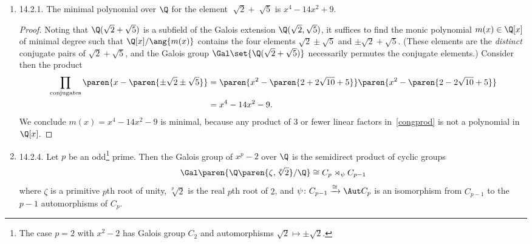 \documentclass[onesided]{ccg-pset}
\author{Colton Grainger}
\date{\today}
\begin{document}
\maketitle

\begin{enumerate}

\item \label{14.2.1} 14.2.1.
The minimal polynomial over $\Q$ for the element $\sqrt[]{ 2 } + \sqrt[]{ 5 }$ is $x^4 - 14x^2 +9$.

\begin{proof}
    Noting that $\Q(\sqrt{ 2 } + \sqrt{ 5 })$ is a subfield of the Galois extension $\Q(\sqrt{ 2 } , \sqrt{ 5 })$, it suffices to find the monic polynomial $m(x) \in \Q[x]$ of minimal degree such that $\Q[x]/\ang{m(x)}$ contains the four elements $\sqrt{ 2 } \pm \sqrt{ 5 }$ and $\pm \sqrt{ 2 } + \sqrt{ 5 }$. (These elements are the \emph{distinct} conjugate pairs of $\sqrt{ 2 } + \sqrt{ 5 }$, and the Galois group $\Gal\set{\Q(\sqrt{ 2 } + \sqrt{ 5 })}$ necessarily permutes the conjugate elements.) Consider then the product
    \begin{align}
        \prod\limits_{\text{conjugates}}\paren{x - \paren{\pm\sqrt{ 2 } \pm \sqrt{ 5 }}} 
        \label{congprod}
            & = \paren{ x^2 -\paren{ 2 + 2\sqrt{ 10 }+5  }  } \paren{ x^2 - \paren{ 2 - 2\sqrt{ 10 } + 5 }  } \\
            & = x^4 - 14x^2 -9.
    \end{align}
    We conclude $m(x) = x^4 - 14x^2 -9$ is minimal, because any product of $3$ or fewer linear factors in~\eqref{congprod} is not a polynomial in $\Q[x]$.
\end{proof}

\item \label{14.2.4} 14.2.4. 
    Let $p$ be an odd\footnote{The case $p=2$ with $x^2 -2$ has Galois group $C_2$ and automorphisms $\sqrt{ 2 } \mapsto \pm \sqrt{ 2 }$.} prime. Then the Galois group of $x^{p}-2$ over $\Q$ is the semidirect product of cyclic groups
    \[
        \Gal\paren{ \Q\paren{ \zeta, \sqrt[p]{ 2 } } / \Q }  \cong C_p \rtimes_\psi C_{p-1}
    \]
    where $\zeta$ is a primitive $p$th root of unity, $\sqrt[p]{ 2 }$ is the real $p$th root of $2$, and $\psi \colon C_{p-1} \xrightarrow{\cong} \Aut C_p$ is an isomorphism from $C_{p-1}$ to the $p-1$ automorphisms of $C_p$.


\end{enumerate}
\end{document}
